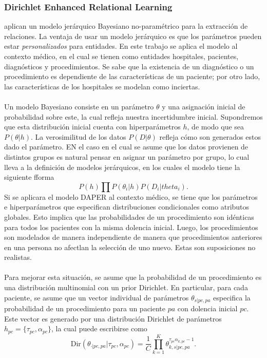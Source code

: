 \documentclass[11pt]{article}
\theoremstyle{plain}
\begin{document}
\subsubsection{Dirichlet Enhanced Relational Learning}
\cite{xu2005dirichlet} aplican un modelo jerárquico Bayesiano no-paramétrico para la extracción de relaciones. La ventaja de usar un modelo jerárquico es que los parámetros pueden estar \textit{personalizados} para entidades. En este trabajo se aplica el modelo al contexto médico, en el cual se tienen como entidades hospitales, pacientes, diagnósticos y procedimientos. Se sabe que la existencia de un diagnóstico o un procedimiento es dependiente de las características de un paciente; por otro lado, las características de los hospitales se modelan como inciertas.\\
\\
Un modelo Bayesiano consiste en un parámetro $\theta$ y una asignación inicial de probabilidad sobre este, la cual refleja nuestra incertidumbre inicial. Supondremos que esta distribución inicial cuenta con hiperparámetros $h$, de modo que sea $P(\theta | h)$. La verosimilitud de los datos $P(D|\theta)$ refleja cómo son generados estos dado el parámetro. EN el caso en el cual se asume que los datos provienen de distintos grupos es natural pensar en asignar un parámetro por grupo, lo cual lleva a la definición de modelos jerárquicos, en los cuales el modelo tiene la siguiente fforma
\[ P(h) \prod P(\theta_i | h )P(D_i | theta_i). \]
Si se aplicara el modelo DAPER al contexto médico, se tiene que los parámetros e hiperparámetros que especifican distribuciones condicionales como atributos globales. Esto implica que las probabilidades de un procedimiento son idénticas para todos los pacientes con la misma dolencia inicial. Luego, los procedimientos son modelados de manera independiente de manera que procedimientos anteriores en una persona no afectlan la selección de uno nuevo. Estas son suposiciones no realistas.\\
\\
Para mejorar esta situación, se asume que la probabilidad de un procedimiento es una distribución multinomial con un prior Dirichlet. En particular, para cada paciente, se asume que un vector individual de parámetros $\theta_{s|pc,pa}$ especifica la probabilidad de un procedimiento para un paciente $pa$ con dolencia inicial $pc$. Este vector es generado por una distribución Dirichlet de parámetros $h_{pc}=\{ \tau_{pc},\alpha_{pc} \}$, la cual puede escribirse como
\[ \textrm{Dir}(\theta_{\cdot | pc, pa} | \tau_{pc},\alpha_{pc}) = \frac{1}{C} \prod_{k=1}^K \theta^{\tau_{pc} \alpha_{k,pc} - 1}_{k,s | pc, pa}.  \]
\end{document}
